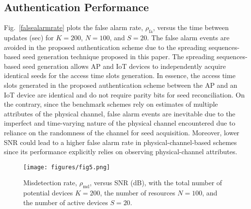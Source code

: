 \documentclass[journal,10pt]{IEEEtran}
\begin{document}
\subsection{Authentication Performance}
Fig.~\ref{falsealarmrate} plots the false alarm rate, $\rho_{\mathrm{fa}}$, versus the time between updates (sec) for $K = 200$, $N = 100$, and $S = 20$. The false alarm events are avoided in the proposed authentication scheme due to the spreading sequences-based seed generation technique proposed in this paper. The spreading sequences-based seed generation allows AP and IoT devices to independently acquire identical seeds for the access time slots generation. In essence, the access time slots generated in the proposed authentication scheme between the AP and an IoT device are identical and do not require parity bits for seed reconciliation. On the contrary, since the benchmark schemes rely on estimates of multiple attributes of the physical channel, false alarm events are inevitable due to the imperfect and time-varying nature of the physical channel encountered due to reliance on the randomness of the channel for seed acquisition. Moreover, lower SNR could lead to a higher false alarm rate in physical-channel-based schemes since its performance explicitly relies on observing physical-channel attributes.


\begin{figure}[t] 
\centering
\texttt{[image: figures/fig5.png]}
\caption{Misdetection rate, $\rho_{\mathrm{md}}$, versus SNR (dB), with the total number of potential devices $K = 200$, the number of resources $N = 100$, and the number of active devices $S = 20$.}
\label{misdetectionrate_notemp}
\end{figure}
\end{document}
